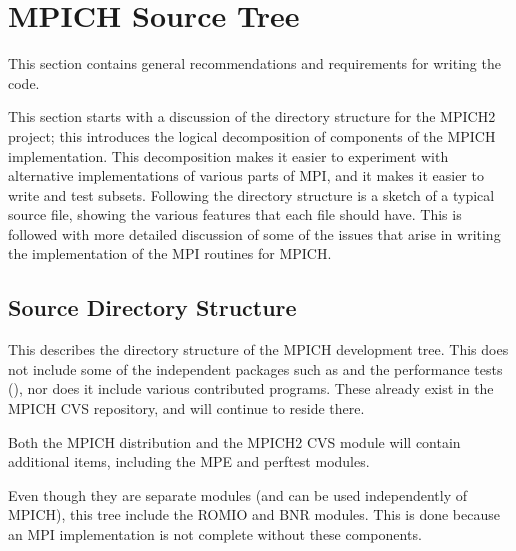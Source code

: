 \documentclass{article}
\begin{document}
\section{MPICH Source Tree}
\label{sec:general}

This section contains general recommendations and requirements for
writing the code.  

This section starts with a discussion of the directory structure for the
MPICH2 project; this introduces the logical decomposition of components of the
MPICH implementation.  This decomposition makes it easier to experiment with
alternative implementations of various parts of MPI, and it makes it easier to
write and test subsets.
Following the directory structure is a sketch of a typical source file,
showing the various features that each file should have.  This is followed
with more detailed discussion of some of the issues that arise in writing the
implementation of the MPI routines for MPICH.

\subsection{Source Directory Structure}
\label{sec:dir-structure}
This describes the directory structure of the MPICH development tree. 
This does not include some of the independent packages such as  and
the performance tests (), nor does it include various
contributed programs.  These already exist in the MPICH CVS repository, and
will continue to reside there.

Both the MPICH distribution and the MPICH2 CVS module will contain additional
items, including the MPE and perftest modules.  

Even though they are separate modules (and can be used independently
of MPICH), this tree include the ROMIO and BNR modules.  This is done
because an MPI implementation is not complete without these components.
\end{document}
